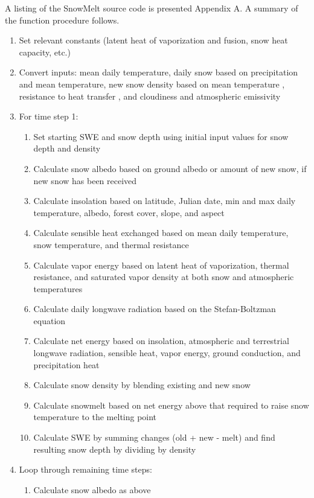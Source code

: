 \documentclass[12pt]{article}
\begin{document}
A listing of the SnowMelt source code is presented Appendix A.
A summary of the function procedure follows.
\begin{enumerate}
  \item Set relevant constants (latent heat of vaporization and fusion, snow heat capacity, etc.)
  \item Convert inputs: mean daily temperature, daily snow based on precipitation and mean temperature, new snow density based on mean temperature \citep{goodison1981measurement}, resistance to heat transfer \citep{campbell1977introduction}, and cloudiness and atmospheric emissivity \citep{fuka2014ecohydrology}
  \item For time step 1:
  \begin{enumerate}
    \item Set starting SWE and snow depth using initial input values for snow depth and density
    \item Calculate snow albedo based on ground albedo or amount of new snow, if new snow has been received
    \item Calculate insolation based on latitude, Julian date, min and max daily temperature, albedo, forest cover, slope, and aspect
    \item Calculate sensible heat exchanged based on mean daily temperature, snow temperature, and thermal resistance
    \item Calculate vapor energy based on latent heat of vaporization, thermal resistance, and saturated vapor density at both snow and atmospheric temperatures
    \item Calculate daily longwave radiation based on the Stefan-Boltzman equation
    \item Calculate net energy based on insolation, atmospheric and terrestrial longwave radiation, sensible heat, vapor energy, ground conduction, and precipitation heat
    \item Calculate snow density by blending existing and new snow
    \item Calculate snowmelt based on net energy above that required to raise snow temperature to the melting point
    \item Calculate SWE by summing changes (old + new - melt) and find resulting snow depth by dividing by density
  \end{enumerate}
  \item Loop through remaining time steps:
  \begin{enumerate}
    \item Calculate snow albedo as above

\end{enumerate}
\end{enumerate}
\end{document}
